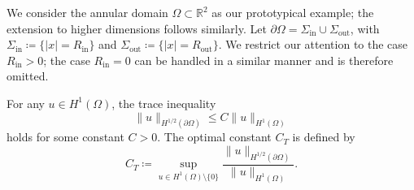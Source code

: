 \documentclass[12pt,reqno]{amsart}
\numberwithin{equation}{section}
\begin{document}
We consider the annular domain $\Omega \subset \mathbb{R}^2$ as our prototypical example; the extension to higher dimensions follows similarly. Let $\partial\Omega = \Sigma_{\mathrm{in}} \cup \Sigma_{\mathrm{out}}$, with $\Sigma_{\mathrm{in}} \coloneqq \{|x| = R_{\mathrm{in}}\}$ and $\Sigma_{\mathrm{out}} \coloneqq \{|x| = R_{\mathrm{out}}\}$. We restrict our attention to the case $R_{\mathrm{in}} > 0$;
the case $R_{\mathrm{in}} = 0$ can be handled in a similar manner and is therefore omitted.

For any $u \in H^1(\Omega)$, the trace inequality
\begin{equation*}
    \|u\|_{H^{1/2}(\partial\Omega)} \le C \|u\|_{H^1(\Omega)}
\end{equation*}
holds for some constant $C > 0$. The optimal constant $C_T$ is defined by
\begin{equation*}
    C_T \coloneqq \sup_{u \in H^1(\Omega) \setminus \{0\}} \frac{\|u\|_{H^{1/2}(\partial\Omega)}}{\|u\|_{H^1(\Omega)}}.
\end{equation*}
\end{document}
